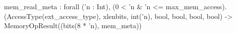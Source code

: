 mem_read_meta : forall ('n : Int), (0 < 'n & 'n <= max_mem_access).
  (AccessType(ext_access_type), xlenbits, int('n), bool, bool, bool, bool) -> MemoryOpResult((bits(8 * 'n), mem_meta))